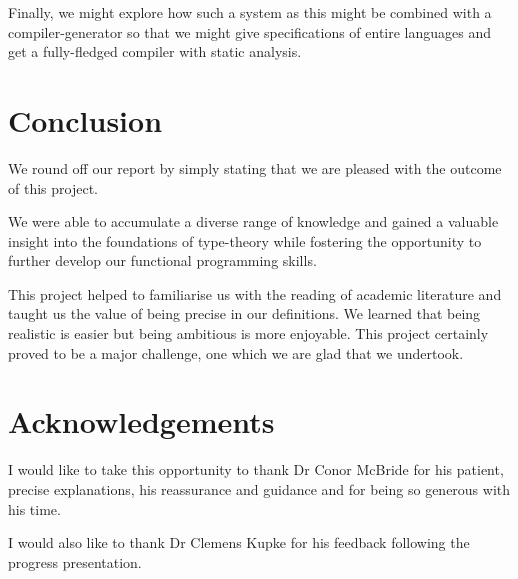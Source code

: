 Finally, we might explore how such a system as this might be combined
with a compiler-generator so that we might give specifications of
entire languages and get a fully-fledged compiler with static
analysis.

\section{Conclusion}

We round off our report by simply stating that we are pleased with the
outcome of this project.

We were able to accumulate a diverse range of knowledge and gained a
valuable insight into the foundations of type-theory while fostering
the opportunity to further develop our functional programming skills.

This project helped to familiarise us with the reading of academic
literature and taught us the value of being precise in our
definitions. We learned that being realistic is easier but being
ambitious is more enjoyable. This project certainly proved to be a
major challenge, one which we are glad that we undertook.

\section{Acknowledgements}
I would like to take this opportunity to thank Dr Conor McBride for
his patient, precise explanations, his reassurance and guidance and
for being so generous with his time.

I would also like to thank Dr Clemens Kupke for his feedback following
the progress presentation.
